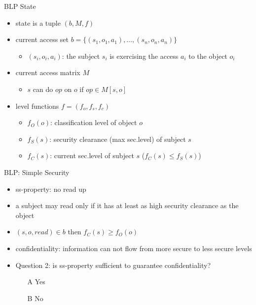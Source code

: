\documentclass{beamer}
\begin{document}
\begin{frame}{BLP State}
  \begin{itemize}
  \item state is a tuple $(b,M,f)$
  \item<2-> current access set $b = \{(s_1,o_1,a_1),\dots,(s_n,o_n,a_n)\}$
    \begin{itemize}
    \item $(s_i,o_i,a_i)$: the subject $s_i$ is exercising the access
      $a_i$ to the object $o_i$
    \end{itemize}
  \item<3-> current access matrix $M$
    \begin{itemize}
    \item $s$ can do $op$ on $o$ if $op \in M[s,o]$
    \end{itemize}
  \item<4-> level functions $f=(f_o, f_s, f_c)$
    \begin{itemize}
      \item $f_O(o)$: classification level of object $o$
      \item $f_S(s)$: security clearance (max sec.level) of subject $s$
      \item $f_C(s)$: current sec.level of subject $s$
        ($f_C(s) \leq f_S(s)$)
    \end{itemize}
  \end{itemize}
\end{frame}

\begin{frame}{BLP: Simple Security}
  \begin{itemize}
  \item ss-property: no read up
  \item a subject may read only if it has at least as high security
    clearance as the object
  \item $(s, o, read) \in b$ then
    $f_C(s) \geq f_O(o)$
  \item<2-> \alert{confidentiality}: information can not flow from more secure to 
        less secure levels\\[20pt]
  \item<3-> Question 2: is ss-property sufficient to guarantee confidentiality?
    \begin{itemize}
      \item [A] Yes
      \item [B] No
    \end{itemize}
  \end{itemize}
\end{frame}
\end{document}
